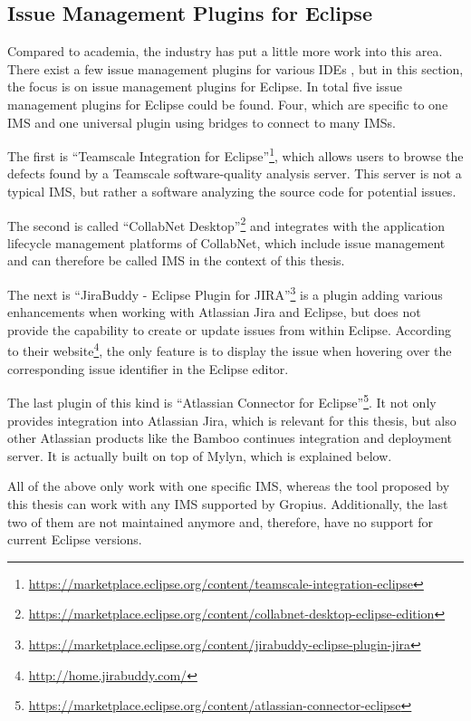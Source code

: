 \subsection{Issue Management Plugins for Eclipse}
\label{ssec:ch2:ss2.3}
Compared to academia, the industry has put a little more work into this area.
There exist a few issue management plugins for various \glspl{IDE} \cite{janak2009issue}, 
but in this section, the focus is on issue management plugins for \gls{Eclipse}.
In total five issue management plugins for \gls{Eclipse} could be found.
Four, which are specific to one \gls{IMS} and one universal plugin using bridges to connect to many \glspl{IMS}.

The first is ``Teamscale Integration for Eclipse''\footnote{\url{https://marketplace.eclipse.org/content/teamscale-integration-eclipse}}, 
which allows users to browse the defects found by a Teamscale software‐quality analysis server.
This server is not a typical \gls{IMS}, but rather a software analyzing the source code for potential issues.

The second is called ``CollabNet Desktop''\footnote{\url{https://marketplace.eclipse.org/content/collabnet-desktop-eclipse-edition}} and 
integrates with the application lifecycle management platforms of CollabNet, which include issue management and can therefore be called \gls{IMS} in the context of this thesis.

The next is ``JiraBuddy - Eclipse Plugin for JIRA''\footnote{\url{https://marketplace.eclipse.org/content/jirabuddy-eclipse-plugin-jira}}
is a plugin adding various enhancements when working with Atlassian Jira and \gls{Eclipse}, but does not provide the capability to create or update 
issues from within \gls{Eclipse}. According to their website\footnote{\url{http://home.jirabuddy.com/}}, the only feature is to display the issue when hovering over the corresponding issue identifier in the \gls{Eclipse} editor.

The last plugin of this kind is ``Atlassian Connector for Eclipse''\footnote{\url{https://marketplace.eclipse.org/content/atlassian-connector-eclipse}}.
It not only provides integration into Atlassian Jira, which is relevant for this thesis, but also other Atlassian products like the Bamboo continues integration and deployment server.
It is actually built on top of Mylyn, which is explained below.

All of the above only work with one specific \gls{IMS}, whereas the tool proposed by this thesis can work with any \gls{IMS} supported by \gls{Gropius}.
Additionally, the last two of them are not maintained anymore and, therefore, have no support for current \gls{Eclipse} versions. 

